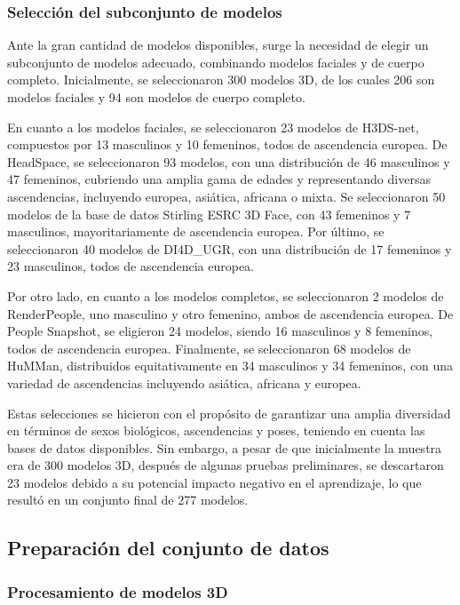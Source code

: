 \subsubsection{Selección del subconjunto de modelos}

Ante la gran cantidad de modelos disponibles, surge la necesidad de elegir un subconjunto de modelos adecuado, combinando modelos faciales y de cuerpo completo.
Inicialmente, se seleccionaron 300 modelos 3D, de los cuales 206 son modelos faciales y 94 son modelos de cuerpo completo.

En cuanto a los modelos faciales, se seleccionaron 23 modelos de H3DS-net, compuestos por 13 masculinos y 10 femeninos, todos de ascendencia europea. De HeadSpace, se seleccionaron 93 modelos, con una distribución de 46 masculinos y 47 femeninos, cubriendo una amplia gama de edades y representando diversas ascendencias, incluyendo europea, asiática, africana o mixta. Se seleccionaron 50 modelos de la base de datos Stirling ESRC 3D Face, con 43 femeninos y 7 masculinos, mayoritariamente de ascendencia europea. Por último, se seleccionaron 40 modelos de DI4D\_UGR, con una distribución de 17 femeninos y 23 masculinos, todos de ascendencia europea.

Por otro lado, en cuanto a los modelos completos, se seleccionaron 2 modelos de RenderPeople, uno masculino y otro femenino, ambos de ascendencia europea. De People Snapshot, se eligieron 24 modelos, siendo 16 masculinos y 8 femeninos, todos de ascendencia europea. Finalmente, se seleccionaron 68 modelos de HuMMan, distribuidos equitativamente en 34 masculinos y 34 femeninos, con una variedad de ascendencias incluyendo asiática, africana y europea.

Estas selecciones se hicieron con el propósito de garantizar una amplia diversidad en términos de sexos biológicos, ascendencias y poses, teniendo en cuenta las bases de datos disponibles. Sin embargo, a pesar de que inicialmente la muestra era de 300 modelos 3D, después de algunas pruebas preliminares, se descartaron 23 modelos debido a su potencial impacto negativo en el aprendizaje, lo que resultó en un conjunto final de 277 modelos.

\subsection{Preparación del conjunto de datos}

\subsubsection{Procesamiento de modelos 3D}

